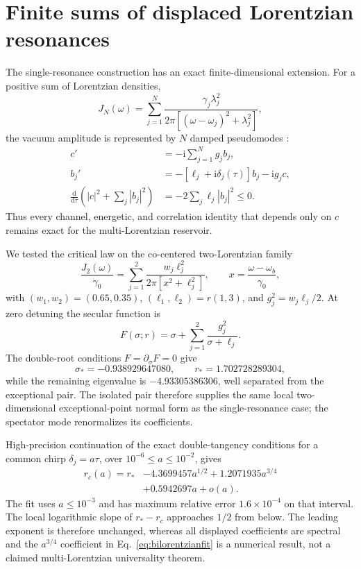 \documentclass[reprint,superscriptaddress,floatfix,amsmath,amssymb,prresearch,aps]{revtex4-2}
\newcommand{\dd}{\mathrm{d}}
\newcommand{\ii}{\mathrm{i}}
\begin{document}
\section{Finite sums of displaced Lorentzian resonances}
\label{app:multilorentzian}

The single-resonance construction has an exact finite-dimensional extension. For
a positive sum of Lorentzian densities,
\begin{equation}
J_N(\omega)=\sum_{j=1}^N
\frac{\gamma_j\lambda_j^2}
{2\pi[(\omega-\omega_j)^2+\lambda_j^2]},
\label{eq:multilorentzianJ}
\end{equation}
the vacuum amplitude is represented by \(N\) damped pseudomodes
\cite{Garraway1997,Pleasance2020}:
\begin{align}
c'&=-\ii\sum_{j=1}^Ng_jb_j,
\nonumber\\
b_j'&=-[\ell_j+\ii\delta_j(\tau)]b_j-\ii g_jc,
\label{eq:multipseudomode}\\
\frac{\dd}{\dd\tau}\left(|c|^2+\sum_j|b_j|^2\right)
&=-2\sum_j\ell_j|b_j|^2\leq0.
\label{eq:multipseudomodenorm}
\end{align}
Thus every channel, energetic, and correlation identity that depends only on
\(c\) remains exact for the multi-Lorentzian reservoir.

We tested the critical law on the co-centered two-Lorentzian family
\begin{equation}
\frac{J_2(\omega)}{\gamma_0}
=\sum_{j=1}^2\frac{w_j\ell_j^2}
{2\pi[x^2+\ell_j^2]},\qquad
x=\frac{\omega-\omega_b}{\gamma_0},
\label{eq:bilorentzianfamily}
\end{equation}
with \((w_1,w_2)=(0.65,0.35)\),
\((\ell_1,\ell_2)=r(1,3)\), and
\(g_j^2=w_j\ell_j/2\). At zero detuning the secular function is
\begin{equation}
F(\sigma;r)=\sigma+\sum_{j=1}^2
\frac{g_j^2}{\sigma+\ell_j}.
\label{eq:multisecular}
\end{equation}
The double-root conditions \(F=\partial_\sigma F=0\) give
\begin{equation}
\sigma_*=-0.938929647080,\qquad r_*=1.702728289304,
\label{eq:biep}
\end{equation}
while the remaining eigenvalue is \(-4.93305386306\), well separated from
the exceptional pair. The isolated pair therefore supplies the same local
two-dimensional exceptional-point normal form as the single-resonance case; the
spectator mode renormalizes its coefficients.

High-precision continuation of the exact double-tangency conditions for a
common chirp \(\delta_j=a\tau\), over
\(10^{-6}\leq a\leq10^{-2}\), gives
\begin{align}
r_c(a)=r_*&-4.3699457a^{1/2}
+1.2071935a^{3/4}
\nonumber\\
&+0.5942697a+o(a).
\label{eq:bilorentzianfit}
\end{align}
The fit uses \(a\leq10^{-3}\) and has maximum relative error
\(1.6\times10^{-4}\) on that interval. The local logarithmic slope of
\(r_*-r_c\) approaches \(1/2\) from below. The leading exponent is therefore
unchanged, whereas all displayed coefficients are spectral and the
\(a^{3/4}\) coefficient in Eq.~\eqref{eq:bilorentzianfit} is a numerical
result, not a claimed multi-Lorentzian universality theorem.
\end{document}
